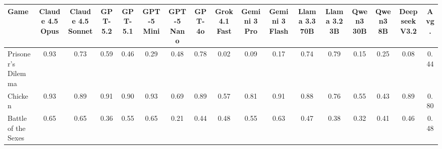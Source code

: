 
\begin{table}[htbp]
\centering
\renewcommand{\arraystretch}{2}
\footnotesize
\begin{adjustbox}{max width=\textwidth}
\begin{tabular}{lccccccccccccccc|c}
\toprule
\textbf{Game} & \textbf{\scriptsize Claude 4.5 Opus} & \textbf{\scriptsize Claude 4.5 Sonnet} & \textbf{\scriptsize GPT-5.2} & \textbf{\scriptsize GPT-5.1} & \textbf{\scriptsize GPT-5 Mini} & \textbf{\scriptsize GPT-5 Nano} & \textbf{\scriptsize GPT-4o} & \textbf{\scriptsize Grok 4.1 Fast} & \textbf{\scriptsize Gemini 3 Pro} & \textbf{\scriptsize Gemini 3 Flash} & \textbf{\scriptsize Llama 3.3 70B} & \textbf{\scriptsize Llama 3.2 3B} & \textbf{\scriptsize Qwen3 30B} & \textbf{\scriptsize Qwen3 8B} & \textbf{\scriptsize Deepseek V3.2} & \textbf{\scriptsize Avg.} \\
\midrule
Prisoner's Dilemma & \cellcolor[HTML]{39A55F}0.93 & \cellcolor[HTML]{94CF8B}0.73 & \cellcolor[HTML]{D7EDAB}0.59 & \cellcolor[HTML]{FBEFB3}0.46 & \cellcolor[HTML]{EEA87F}0.29 & \cellcolor[HTML]{FDF7B9}0.48 & \cellcolor[HTML]{7FC581}0.78 & \cellcolor[HTML]{D8392D}0.02 & \cellcolor[HTML]{DD5441}0.09 & \cellcolor[HTML]{E4785B}0.17 & \cellcolor[HTML]{8FCC88}0.74 & \cellcolor[HTML]{7BC37F}0.79 & \cellcolor[HTML]{E26C53}0.15 & \cellcolor[HTML]{EA9571}0.25 & \cellcolor[HTML]{DD513F}0.08 & \cellcolor[HTML]{F9E4AB}0.44 \\
Chicken & \cellcolor[HTML]{3AA65F}0.93 & \cellcolor[HTML]{4AAD67}0.89 & \cellcolor[HTML]{43AA63}0.91 & \cellcolor[HTML]{48AD66}0.90 & \cellcolor[HTML]{38A55E}0.93 & \cellcolor[HTML]{A8D894}0.69 & \cellcolor[HTML]{4CAE68}0.89 & \cellcolor[HTML]{DEF0AF}0.57 & \cellcolor[HTML]{71BF7A}0.81 & \cellcolor[HTML]{41A963}0.91 & \cellcolor[HTML]{52B16B}0.88 & \cellcolor[HTML]{85C884}0.76 & \cellcolor[HTML]{E7F4B3}0.55 & \cellcolor[HTML]{F9E3AA}0.43 & \cellcolor[HTML]{4BAE68}0.89 & \cellcolor[HTML]{77C17D}0.80 \\
Battle of the Sexes & \cellcolor[HTML]{BADF9D}0.65 & \cellcolor[HTML]{BAE09D}0.65 & \cellcolor[HTML]{F4C695}0.36 & \cellcolor[HTML]{E7F4B3}0.55 & \cellcolor[HTML]{B9DF9D}0.65 & \cellcolor[HTML]{E88868}0.21 & \cellcolor[HTML]{FAE6AD}0.44 & \cellcolor[HTML]{FDF6B8}0.48 & \cellcolor[HTML]{E6F4B3}0.55 & \cellcolor[HTML]{C1E3A1}0.63 & \cellcolor[HTML]{FCF2B6}0.47 & \cellcolor[HTML]{F5CC99}0.38 & \cellcolor[HTML]{F0B589}0.32 & \cellcolor[HTML]{F7DAA3}0.41 & \cellcolor[HTML]{FBEDB2}0.46 & \cellcolor[HTML]{FDF7B9}0.48 \\

\end{tabular}
\end{adjustbox}
\end{table}
